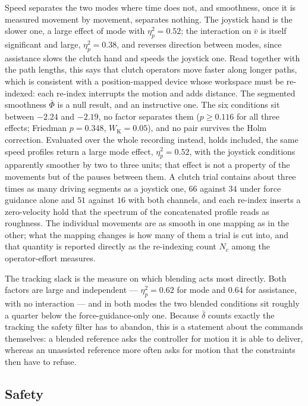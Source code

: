 Speed separates the two modes where time does not, and smoothness, once it is measured movement by movement, separates nothing. The joystick hand is the slower one, a large effect of mode with $\eta^2_p = 0.52$; the interaction on $\bar{v}$ is itself significant and large, $\eta^2_p = 0.38$, and reverses direction between modes, since assistance slows the clutch hand and speeds the joystick one. Read together with the path lengths, this says that clutch operators move faster along longer paths, which is consistent with a position-mapped device whose workspace must be re-indexed: each re-index interrupts the motion and adds distance. The segmented smoothness $\bar\Phi$ is a null result, and an instructive one. The six conditions sit between $-2.24$ and $-2.19$, no factor separates them ($p \ge 0.116$ for all three effects; Friedman $p = 0.348$, $W_{\mathrm{K}} = 0.05$), and no pair survives the Holm correction. Evaluated over the whole recording instead, holds included, the same speed profiles return a large mode effect, $\eta^2_p = 0.52$, with the joystick conditions apparently smoother by two to three units; that effect is not a property of the movements but of the pauses between them. A clutch trial contains about three times as many driving segments as a joystick one, $66$ against $34$ under force guidance alone and $51$ against $16$ with both channels, and each re-index inserts a zero-velocity hold that the spectrum of the concatenated profile reads as roughness. The individual movements are as smooth in one mapping as in the other; what the mapping changes is how many of them a trial is cut into, and that quantity is reported directly as the re-indexing count $N_c$ among the operator-effort measures.

The tracking slack is the measure on which blending acts most directly. Both factors are large and independent --- $\eta^2_p = 0.62$ for mode and $0.64$ for assistance, with no interaction --- and in both modes the two blended conditions sit roughly a quarter below the force-guidance-only one. Because $\bar\delta$ counts exactly the tracking the safety filter has to abandon, this is a statement about the commands themselves: a blended reference asks the controller for motion it is able to deliver, whereas an unassisted reference more often asks for motion that the constraints then have to refuse.



\subsection{Safety}
\label{sec:ressafety}

